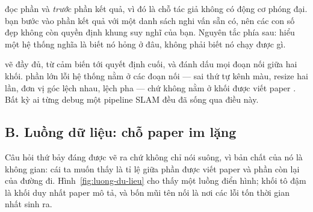 \documentclass[../../deep_learning.tex]{subfiles}
\begin{document}
\begin{mach}
\item {} \gp đọc phần  và  \emph{trước} phần kết quả, vì đó là chỗ tác giả không có động cơ phóng đại. \hq bạn bước vào phần kết quả với một danh sách nghi vấn sẵn có, nên các con số đẹp không còn quyền định khung suy nghĩ của bạn. Nguyên tắc phía sau: hiểu một hệ thống nghĩa là biết nó hỏng ở đâu, không phải biết nó chạy được gì.
\item {} \gp vẽ  đầy đủ, từ cảm biến tới quyết định cuối, và đánh dấu mọi đoạn nối giữa hai khối. \hq phần lớn lỗi hệ thống nằm ở các đoạn nối --- sai thứ tự kênh màu, resize hai lần, đơn vị góc lệch nhau,  lệch pha --- chứ không nằm ở khối được viết paper \cite{sculley2015hidden}. Bất kỳ ai từng debug một pipeline SLAM đều đã sống qua điều này. 
\end{mach}

\subsection{B. Luồng dữ liệu: chỗ paper im lặng}
Câu hỏi thứ bảy đáng được vẽ ra chứ không chỉ nói suông, vì bản chất của nó là không gian: cái ta muốn thấy là tỉ lệ giữa phần được viết paper và phần còn lại của đường đi. Hình~\ref{fig:luong-du-lieu} cho thấy một luồng điển hình; khối tô đậm là khối duy nhất paper mô tả, và bốn mũi tên nối là nơi các lỗi tốn thời gian nhất sinh ra.
\end{document}

